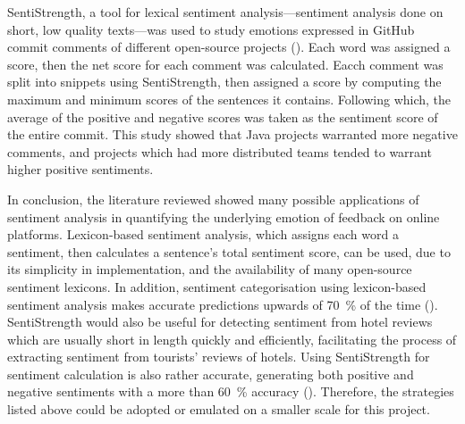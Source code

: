 \documentclass[12pt, twoside, a4paper, draft]{pancake-article}
\begin{document}
SentiStrength, a tool for lexical sentiment analysis---sentiment analysis
done on short, low quality texts---was used to study emotions expressed
in GitHub commit comments of different open-source projects (\cite{github}).
Each word was assigned a score, then the net score for each comment was calculated.
Eacch comment was split into snippets using SentiStrength, then assigned a score by
computing the maximum and minimum scores of the sentences it contains.
Following which, the average of the positive and negative scores was taken as the
sentiment score of the entire commit. This study showed that Java projects warranted
more negative comments, and projects which had more distributed teams tended
to warrant higher positive sentiments.

In conclusion, the literature reviewed showed many possible applications
of sentiment analysis in quantifying the underlying emotion of feedback
on online platforms. Lexicon-based sentiment analysis, which assigns each
word a sentiment, then calculates a sentence's total sentiment score, can
be used, due to its simplicity in implementation, and the availability of
many open-source sentiment lexicons. In addition, sentiment categorisation
using lexicon-based sentiment analysis makes accurate predictions upwards of
\qty{70}{\percent} of the time (\cite{khoo}). SentiStrength would also be useful for
detecting sentiment from hotel reviews which are usually short in length quickly
and efficiently, facilitating the process of extracting sentiment from tourists'
reviews of hotels. Using SentiStrength for sentiment calculation is also
rather accurate, generating both positive and negative sentiments with a more
than \qty{60}{\percent} accuracy (\cite{thelwall}). Therefore, the strategies listed
above could be adopted or emulated on a smaller scale for this project.



\end{document}
